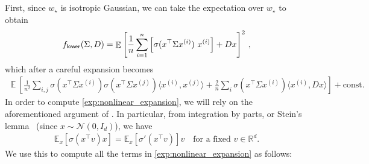 \documentclass{article}
\DeclareMathOperator{\E}{\mathbb{E}}
\newcommand{\R}{\mathbb{R}}
\newcommand{\relu}{\sigma}
\newcommand{\wstar}{w_\star}
\newcommand{\tx}[1]{x^{(#1)}}
\newcommand{\ttf}{f_{\sf lower}}
\newcommand{\inpp}[2]{ \langle #1,#2\rangle}
\begin{document}
First, since $\wstar$ is isotropic Gaussian, we can take the expectation over $\wstar$ to obtain
\begin{align}
     \ttf(\Sigma, D) =  \E \left[  \frac{1}{n}\sum_{i=1}^n \left[  \relu (x^\top \Sigma \tx{i}  ) \ \tx{i}\right] +   D x   \right]^2\,,
\end{align} 
which after a careful expansion becomes
\begin{align} \label{exp:nonlinear_expansion}
    \E \left[  \frac{1}{n^2}\sum_{i,j}   \relu (x^\top \Sigma \tx{i}  )  \relu (x^\top \Sigma \tx{j}  )  \inpp{\tx{i}}{\tx{j}} +  \frac{2}{n}\sum_{i}    \relu (x^\top \Sigma \tx{i}  )  \inpp{\tx{i}}{Dx}   \right]  + \text{const.} \quad\quad
\end{align} 
In order to compute \eqref{exp:nonlinear_expansion}, we will rely on the aforementioned argument of \cite{erdogdu2016scaled}.
In particular, from integration by parts, or Stein's lemma~\citep{erdogdu2016scaled} (since $x\sim \mathcal{N}(0,I_d)$), we have 
\begin{align}
\mathbb{E}_{x} [  \sigma(x^\top v) x] = \mathbb{E}_{x} [\sigma'(x^\top v) ] v \quad \text{for a fixed $v\in \R^d$.}    
\end{align} 
We use this to compute all the terms in \eqref{exp:nonlinear_expansion} as follows:
\end{document}

